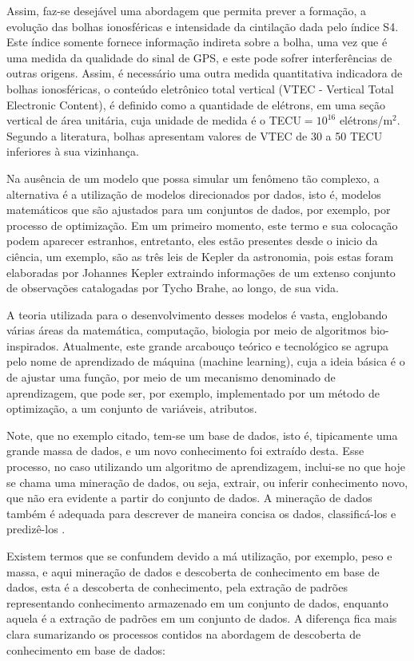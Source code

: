Assim, faz-se desejável uma abordagem que permita prever a formação, a evolução das bolhas ionosféricas e intensidade da cintilação dada pelo índice S4. Este índice somente fornece informação indireta sobre a bolha, uma vez que é uma medida da qualidade do sinal de GPS, e este pode sofrer interferências de outras origens. Assim, é necessário uma outra medida quantitativa indicadora de bolhas ionosféricas, o conteúdo eletrônico total vertical (VTEC - Vertical Total Electronic Content), é definido como a quantidade de elétrons, em uma seção vertical de área unitária, cuja unidade de medida é o TECU$=10^{16}$ elétrons/m$^2$. Segundo a literatura, bolhas apresentam valores de VTEC de 30 a 50 TECU inferiores à sua vizinhança.

Na ausência de um modelo que possa simular um fenômeno tão complexo, a alternativa é a utilização de modelos direcionados por dados, isto é, modelos matemáticos que são ajustados para um conjuntos de dados, por exemplo, por processo de optimização. Em um primeiro momento, este termo e sua colocação podem aparecer estranhos, entretanto, eles estão presentes desde o inicio da ciência, um exemplo, são as três leis de Kepler da astronomia, pois estas foram elaboradas por Johannes Kepler extraindo informações de um extenso conjunto de observações catalogadas por Tycho Brahe, ao longo, de sua vida. 

A teoria utilizada para o desenvolvimento desses modelos é vasta, englobando várias áreas da matemática, computação, biologia por meio de algoritmos bio-inspirados. Atualmente, este grande arcabouço teórico e tecnológico se agrupa pelo nome de aprendizado de máquina (machine learning), cuja a ideia básica é o de ajustar uma função, por meio de um mecanismo denominado de aprendizagem, que pode ser, por exemplo, implementado por um método de optimização, a um conjunto de variáveis, atributos. 

Note, que no exemplo citado, tem-se um base de dados, isto é, tipicamente uma grande massa de dados, e um novo conhecimento foi extraído desta. Esse processo, no caso utilizando um algoritmo de aprendizagem, inclui-se no que hoje se chama uma mineração de dados, ou seja, extrair, ou inferir conhecimento novo, que não era evidente a partir do conjunto de dados. A mineração de dados também é adequada para descrever de maneira concisa os dados, classificá-los e predizê-los \cite{HAN:2011}. 

Existem termos que se confundem devido a má utilização, por exemplo, peso e massa, e aqui mineração de dados e descoberta de conhecimento em base de dados, esta é a descoberta de conhecimento, pela extração de padrões representando conhecimento armazenado em um conjunto de dados, enquanto aquela é a extração de padrões em um conjunto de dados. A diferença fica mais clara sumarizando os processos contidos na abordagem de descoberta de conhecimento em base de dados:

